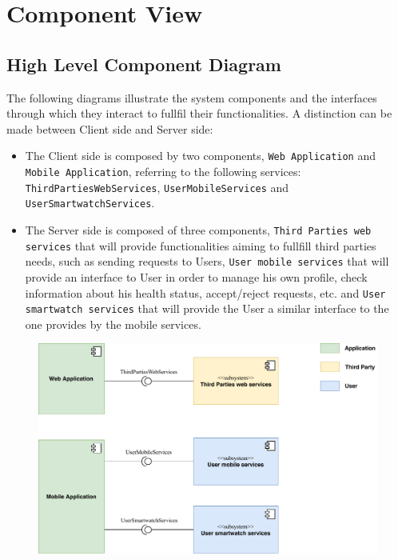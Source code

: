 \documentclass[12pt,a4paper]{article}
\begin{document}
\section{Component View}
	\subsection{High Level Component Diagram}	
	The following diagrams illustrate the system components and the interfaces through which they interact to fullfil their functionalities. A distinction can be made between Client side and Server side:
	\begin{itemize}
		\item The Client side is composed by two components, \texttt{Web Application} and \texttt{Mobile Application},  referring to the following services:\\
		\texttt{ThirdPartiesWebServices}, \texttt{UserMobileServices} and \texttt{UserSmartwatchServices}. 
		
		\item The Server side is composed of three components, \texttt{Third Parties web services} that will provide functionalities aiming to fullfill third parties needs, such as sending requests to Users, \texttt{User mobile services} that will provide an interface to User in order to manage his own profile, check information about his health status, accept/reject requests, etc. and \texttt{User smartwatch services} that will provide the User a similar interface to the one provides by the mobile services.
	\end{itemize}
	
	\begin{figure}[h]
		\centering
		\includegraphics[width=1.0\linewidth]{images/high_lvl_comp_diag}
		\label{fig:highlvlcompdiag}
	\end{figure}
\end{document}
